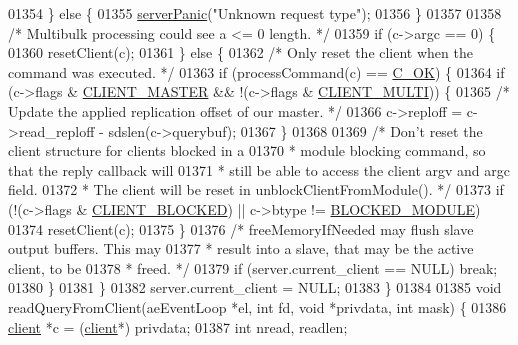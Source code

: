 \begin{DoxyCode}
{{{{{{{{{{{{{{{01354         \} \textcolor{keywordflow}{else} \{
01355             \hyperlink{server_8h_a11cc378e7778a830b41240578de3b204}{serverPanic}(\textcolor{stringliteral}{"Unknown request type"});
01356         \}
01357 
01358         \textcolor{comment}{/* Multibulk processing could see a <= 0 length. */}
01359         \textcolor{keywordflow}{if} (c->argc == 0) \{
01360             resetClient(c);
01361         \} \textcolor{keywordflow}{else} \{
01362             \textcolor{comment}{/* Only reset the client when the command was executed. */}
01363             \textcolor{keywordflow}{if} (processCommand(c) == \hyperlink{server_8h_a303769ef1065076e68731584e758d3e1}{C\_OK}) \{
01364                 \textcolor{keywordflow}{if} (c->flags & \hyperlink{server_8h_a3d8f0cc8d0653ee2b6dafb454292c069}{CLIENT\_MASTER} && !(c->flags & 
      \hyperlink{server_8h_a7f61f783f429419f8c593291a509b03a}{CLIENT\_MULTI})) \{
01365                     \textcolor{comment}{/* Update the applied replication offset of our master. */}
01366                     c->reploff = c->read\_reploff - sdslen(c->querybuf);
01367                 \}
01368 
01369                 \textcolor{comment}{/* Don't reset the client structure for clients blocked in a}
01370 \textcolor{comment}{                 * module blocking command, so that the reply callback will}
01371 \textcolor{comment}{                 * still be able to access the client argv and argc field.}
01372 \textcolor{comment}{                 * The client will be reset in unblockClientFromModule(). */}
01373                 \textcolor{keywordflow}{if} (!(c->flags & \hyperlink{server_8h_a503ad979164a52f0f5e2a63e4c7da3a0}{CLIENT\_BLOCKED}) || c->btype != 
      \hyperlink{server_8h_a6bdaa78b1c4c376ebf666afb891ace42}{BLOCKED\_MODULE})
01374                     resetClient(c);
01375             \}
01376             \textcolor{comment}{/* freeMemoryIfNeeded may flush slave output buffers. This may}
01377 \textcolor{comment}{             * result into a slave, that may be the active client, to be}
01378 \textcolor{comment}{             * freed. */}
01379             \textcolor{keywordflow}{if} (server.current\_client == NULL) \textcolor{keywordflow}{break};
01380         \}
01381     \}
01382     server.current\_client = NULL;
01383 \}
01384 
01385 \textcolor{keywordtype}{void} readQueryFromClient(aeEventLoop *el, \textcolor{keywordtype}{int} fd, \textcolor{keywordtype}{void} *privdata, \textcolor{keywordtype}{int} mask) \{
01386     \hyperlink{structclient}{client} *c = (\hyperlink{structclient}{client}*) privdata;
01387     \textcolor{keywordtype}{int} nread, readlen;
}}}}}}}}}}}}}}}
\end{DoxyCode}
